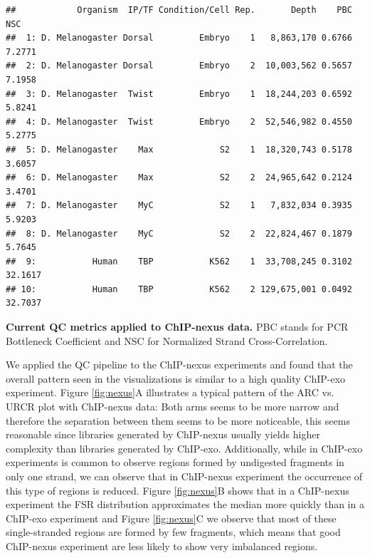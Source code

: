 \documentclass{bmcart}\usepackage[]{graphicx}\usepackage[]{color}
\makeatletter
\newenvironment{kframe}{%
 \def\at@end@of@kframe{}%
 \ifinner\ifhmode%
  \def\at@end@of@kframe{\end{minipage}}%
  \begin{minipage}{\columnwidth}%
 \fi\fi%
 \def\FrameCommand##1{\hskip\@totalleftmargin \hskip-\fboxsep
 \colorbox{shadecolor}{##1}\hskip-\fboxsep
     \hskip-\linewidth \hskip-\@totalleftmargin \hskip\columnwidth}%
 \MakeFramed {\advance\hsize-\width
   \@totalleftmargin\z@ \linewidth\hsize
   \@setminipage}}%
 {\par\unskip\endMakeFramed%
 \at@end@of@kframe}
\newenvironment{knitrout}{}{} %
\makeatother
\begin{document}
\begin{table}[h!]
  \centering
\begin{knitrout}
\color{fgcolor}\begin{kframe}
\begin{verbatim}
##            Organism  IP/TF Condition/Cell Rep.       Depth    PBC     NSC
##  1: D. Melanogaster Dorsal         Embryo    1   8,863,170 0.6766  7.2771
##  2: D. Melanogaster Dorsal         Embryo    2  10,003,562 0.5657  7.1958
##  3: D. Melanogaster  Twist         Embryo    1  18,244,203 0.6592  5.8241
##  4: D. Melanogaster  Twist         Embryo    2  52,546,982 0.4550  5.2775
##  5: D. Melanogaster    Max             S2    1  18,320,743 0.5178  3.6057
##  6: D. Melanogaster    Max             S2    2  24,965,642 0.2124  3.4701
##  7: D. Melanogaster    MyC             S2    1   7,832,034 0.3935  5.9203
##  8: D. Melanogaster    MyC             S2    2  22,824,467 0.1879  5.7645
##  9:           Human    TBP           K562    1  33,708,245 0.3102 32.1617
## 10:           Human    TBP           K562    2 129,675,001 0.0492 32.7037
\end{verbatim}
\end{kframe}
\end{knitrout}
\caption{\textbf{Current QC metrics applied to ChIP-nexus data.} PBC
  stands for PCR Bottleneck Coefficient and NSC for Normalized Strand
  Cross-Correlation.}
  \label{tab:nexus}
\end{table}

We applied the QC pipeline to the ChIP-nexus experiments and found
that the overall pattern seen in the visualizations is similar to a
high quality ChIP-exo experiment. Figure \ref{fig:nexus}A illustrates
a typical pattern of the ARC vs. URCR plot with ChIP-nexus data: Both
arms seems to be more narrow and therefore the separation between them
seems to be more noticeable, this seems reasonable since libraries
generated by ChIP-nexus usually yields higher complexity than
libraries generated by ChIP-exo. Additionally, while in ChIP-exo
experiments is common to observe regions formed by undigested
fragments in only one strand, we can observe that in ChIP-nexus
experiment the occurrence of this type of regions is reduced. Figure
\ref{fig:nexus}B shows that in a ChIP-nexus experiment the FSR
distribution approximates the median more quickly than in a ChIP-exo
experiment and Figure \ref{fig:nexus}C we observe that most of these
single-stranded regions are formed by few fragments, which means that
good ChIP-nexus experiment are less likely to show very imbalanced
regions. 
\end{document}
